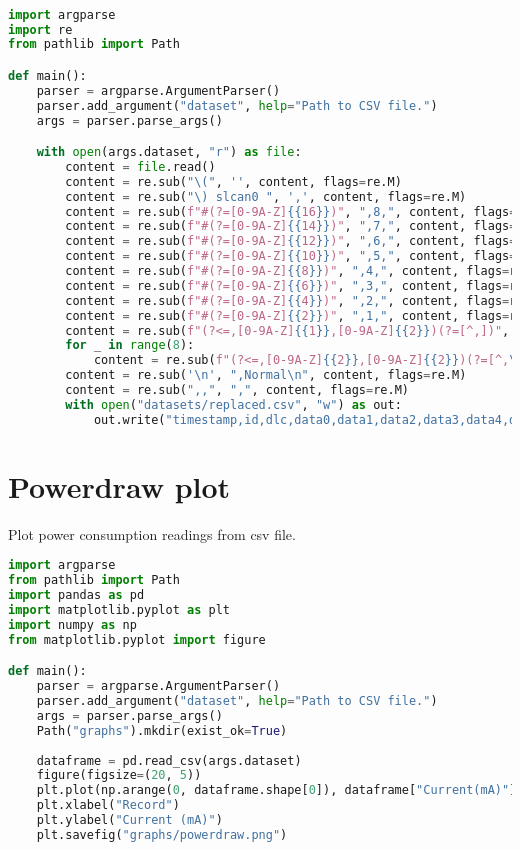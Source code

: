 \begin{lstlisting}[language=Python]

import argparse
import re
from pathlib import Path

def main():
    parser = argparse.ArgumentParser()
    parser.add_argument("dataset", help="Path to CSV file.")
    args = parser.parse_args()

    with open(args.dataset, "r") as file:
        content = file.read()
        content = re.sub("\(", '', content, flags=re.M)
        content = re.sub("\) slcan0 ", ',', content, flags=re.M)
        content = re.sub(f"#(?=[0-9A-Z]{{16}})", ",8,", content, flags=re.M)
        content = re.sub(f"#(?=[0-9A-Z]{{14}})", ",7,", content, flags=re.M)
        content = re.sub(f"#(?=[0-9A-Z]{{12}})", ",6,", content, flags=re.M)
        content = re.sub(f"#(?=[0-9A-Z]{{10}})", ",5,", content, flags=re.M)
        content = re.sub(f"#(?=[0-9A-Z]{{8}})", ",4,", content, flags=re.M)
        content = re.sub(f"#(?=[0-9A-Z]{{6}})", ",3,", content, flags=re.M)
        content = re.sub(f"#(?=[0-9A-Z]{{4}})", ",2,", content, flags=re.M)
        content = re.sub(f"#(?=[0-9A-Z]{{2}})", ",1,", content, flags=re.M)
        content = re.sub(f"(?<=,[0-9A-Z]{{1}},[0-9A-Z]{{2}})(?=[^,])", ',', content, flags=re.M)
        for _ in range(8):
            content = re.sub(f"(?<=,[0-9A-Z]{{2}},[0-9A-Z]{{2}})(?=[^,\n])", ',', content, flags=re.M)
        content = re.sub('\n', ",Normal\n", content, flags=re.M)
        content = re.sub(",,", ",", content, flags=re.M)
        with open("datasets/replaced.csv", "w") as out:
            out.write("timestamp,id,dlc,data0,data1,data2,data3,data4,data5,data6,data7,label\n" + content)
\end{lstlisting}

\section{Powerdraw plot}

Plot power consumption readings from \gls{csv} file.

\begin{lstlisting}[language=Python]
import argparse
from pathlib import Path
import pandas as pd
import matplotlib.pyplot as plt
import numpy as np
from matplotlib.pyplot import figure

def main():
    parser = argparse.ArgumentParser()
    parser.add_argument("dataset", help="Path to CSV file.")
    args = parser.parse_args()
    Path("graphs").mkdir(exist_ok=True)
    
    dataframe = pd.read_csv(args.dataset)
    figure(figsize=(20, 5))
    plt.plot(np.arange(0, dataframe.shape[0]), dataframe["Current(mA)"])
    plt.xlabel("Record")
    plt.ylabel("Current (mA)")
    plt.savefig("graphs/powerdraw.png")
\end{lstlisting}